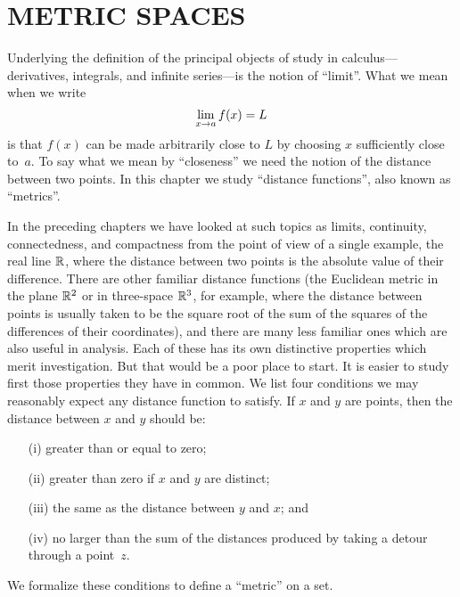 \chapter{METRIC SPACES}\label{metric}

Underlying the definition of the principal objects of study in calculus---derivatives,
integrals, and infinite series---is the notion of ``limit''. What we mean when we write
     \[\lim_{x \rightarrow a}f(x) = L\]
is that $f(x)$ can be made arbitrarily close to $L$ by choosing $x$ sufficiently close to~$a$.
To say what we mean by ``closeness'' we need the notion of the distance between two points. In
this chapter we study ``distance functions'', also known as ``metrics''.

In the preceding chapters we have looked at such topics as limits, continuity, connectedness,
and compactness from the point of view of a single example, the real line $\mathbb{R}$, where the
distance between two points is the absolute value of their difference.  There are other
familiar distance functions (the Euclidean metric in the plane $\mathbb{R}^2$ or in three-space
$\mathbb{R}^3$, for example, where the distance between points is usually taken to be the square root
of the sum of the squares of the differences of their coordinates), and there are many less
familiar ones which are also useful in analysis. Each of these has its own distinctive
properties which merit investigation. But that would be a poor place to start. It is easier to
study first those properties they have in common. We list four conditions we may reasonably
expect any distance function to satisfy.  If $x$ and $y$ are points, then the distance between
$x$ and $y$ should be:
 \begin{enumerate}
  \item[(i)] greater than or equal to zero;
  \item[(ii)] greater than zero if $x$ and $y$ are distinct;
  \item[(iii)] the same as the distance between $y$ and $x$; and
  \item[(iv)] no larger than the sum of the distances produced by taking a detour through a point~$z$.
 \end{enumerate}
We formalize these conditions to define a ``metric'' on a set.




